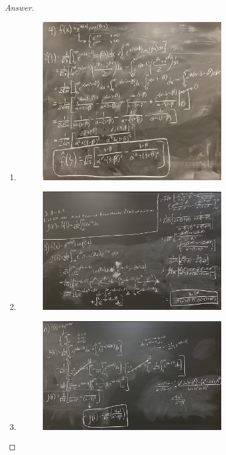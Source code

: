 \documentclass{article}
\theoremstyle{definition}
\renewcommand\qedsymbol{$\blacksquare$}
\newenvironment{ans}{\begin{proof}[Answer]\renewcommand{\qedsymbol}{}}{\end{proof}}
\begin{document}
\begin{ans}
\begin{enumerate}
        \item \phantom{.}
        \begin{figure}[H]
            \centering
            \includegraphics[width = 0.75\textwidth]{Problem 2 Part 4.jpeg}
        \end{figure}

        \item \phantom{.}
        \begin{figure}[H]
            \centering
            \includegraphics[width = 0.75\textwidth]{Problem 2 Part 5.jpeg}
        \end{figure}

        \item \phantom{.}
        \begin{figure}[H]
            \centering
            \includegraphics[width = 0.75\textwidth]{Problem 2 Part 6.jpeg}
        \end{figure}


\end{enumerate}
\end{ans}
\end{document}
